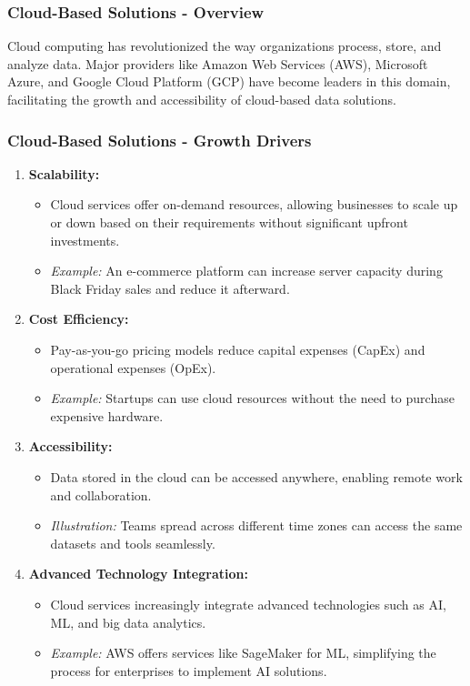 \documentclass{beamer}
\begin{document}
\begin{frame}[fragile]
    \frametitle{Cloud-Based Solutions - Overview}
    Cloud computing has revolutionized the way organizations process, store, and analyze data. 
    Major providers like Amazon Web Services (AWS), Microsoft Azure, and Google Cloud Platform (GCP) have become leaders in this domain, facilitating the growth and accessibility of cloud-based data solutions.
\end{frame}

\begin{frame}[fragile]
    \frametitle{Cloud-Based Solutions - Growth Drivers}
    \begin{enumerate}
        \item \textbf{Scalability:} 
        \begin{itemize}
            \item Cloud services offer on-demand resources, allowing businesses to scale up or down based on their requirements without significant upfront investments.
            \item \textit{Example:} An e-commerce platform can increase server capacity during Black Friday sales and reduce it afterward.
        \end{itemize}
        
        \item \textbf{Cost Efficiency:}
        \begin{itemize}
            \item Pay-as-you-go pricing models reduce capital expenses (CapEx) and operational expenses (OpEx).
            \item \textit{Example:} Startups can use cloud resources without the need to purchase expensive hardware.
        \end{itemize}
        
        \item \textbf{Accessibility:}
        \begin{itemize}
            \item Data stored in the cloud can be accessed anywhere, enabling remote work and collaboration.
            \item \textit{Illustration:} Teams spread across different time zones can access the same datasets and tools seamlessly.
        \end{itemize}
        
        \item \textbf{Advanced Technology Integration:}
        \begin{itemize}
            \item Cloud services increasingly integrate advanced technologies such as AI, ML, and big data analytics.
            \item \textit{Example:} AWS offers services like SageMaker for ML, simplifying the process for enterprises to implement AI solutions.
        \end{itemize}


\end{enumerate}
\end{frame}
\end{document}
